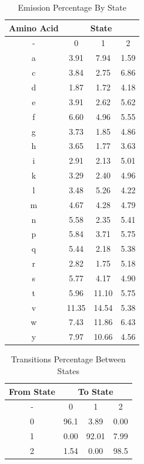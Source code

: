 \documentclass[a4paper,11pt]{article}
\begin{document}
\begin{table}[!hbp]
    \centering
    \caption{Emission Percentage By State}
    \vspace{0.5cm}
    \begin{tabular}{|c|c  c  c|}
        \hline
        \textbf{Amino Acid} & \multicolumn{3}{|c|}{\textbf{State}} \\
        \hline
        -  &  0 & 1 & 2 \\
        \hline
        a & 3.91 & 7.94 & 1.59 \\
        \hline
        c & 3.84 & 2.75 & 6.86 \\
        \hline
        d & 1.87 & 1.72 & 4.18 \\
        \hline
        e & 3.91 & 2.62 & 5.62 \\
        \hline
        f & 6.60 & 4.96 & 5.55 \\
        \hline
        g & 3.73 & 1.85 & 4.86 \\
        \hline
        h & 3.65 & 1.77 & 3.63 \\
        \hline
        i & 2.91 & 2.13 & 5.01 \\
        \hline
        k & 3.29 & 2.40 & 4.96 \\
        \hline
        l & 3.48 & 5.26 & 4.22 \\
        \hline
        m & 4.67 & 4.28 & 4.79 \\
        \hline
        n & 5.58 & 2.35 & 5.41 \\
        \hline
        p & 5.84 & 3.71 & 5.75 \\
        \hline
        q & 5.44 & 2.18 & 5.38 \\
        \hline
        r & 2.82 & 1.75 & 5.18 \\
        \hline
        s & 5.77 & 4.17 & 4.90 \\
        \hline
        t & 5.96 & 11.10 & 5.75 \\
        \hline
        v & 11.35 & 14.54 & 5.38 \\
        \hline
        w & 7.43 & 11.86 & 6.43 \\
        \hline
        y & 7.97 & 10.66 & 4.56 \\
        \hline
    \end{tabular}
    \label{emissions}
\end{table}


\begin{table}[!ht]
    \centering
    \caption{Transitions Percentage Between States }
    \vspace{0.5cm}
    \begin{tabular}{|c|c c c|}
        \hline
        \textbf{From State} & \multicolumn{3}{c|}{\textbf{To State}} \\
        \hline
        - & 0 & 1 & 2 \\
        \hline
        0 & 96.1 & 3.89 & 0.00 \\
        1 & 0.00 & 92.01 & 7.99 \\
        2 & 1.54 & 0.00 & 98.5 \\
        \hline
    \end{tabular}
    \label{transitions}
\end{table}
\end{document}
